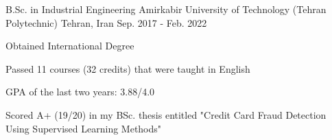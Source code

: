 

\begin{cventries}

  \cventry
    {B.Sc. in Industrial Engineering} %
    {Amirkabir University of Technology (Tehran Polytechnic)} %
    {Tehran, Iran} %
    {Sep. 2017 - Feb. 2022} %
    {
      \begin{cvitems} %
        \item {Obtained International Degree}
        \item {Passed 11 courses (32 credits) that were taught in English}
        \item {GPA of the last two years: 3.88/4.0}
        \item {Scored A+ (19/20) in my BSc. thesis entitled "Credit Card Fraud Detection Using Supervised Learning Methods"}
      \end{cvitems}
    }

\end{cventries}
